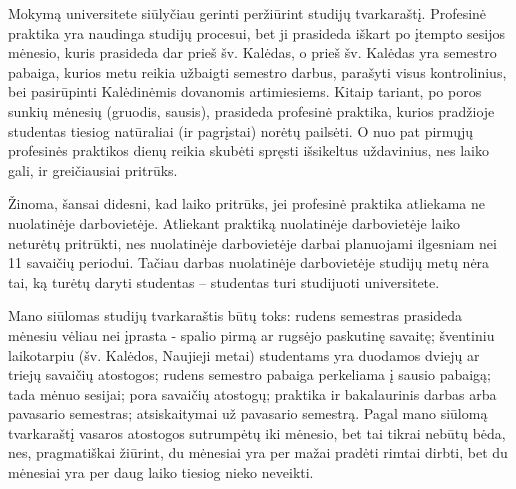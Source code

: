 Mokymą universitete siūlyčiau gerinti peržiūrint studijų tvarkaraštį. Profesinė praktika yra naudinga studijų procesui, bet ji prasideda iškart po įtempto sesijos mėnesio, kuris prasideda dar prieš šv. Kalėdas, o prieš šv. Kalėdas yra semestro pabaiga, kurios metu reikia užbaigti semestro darbus, parašyti visus kontrolinius, bei pasirūpinti Kalėdinėmis dovanomis artimiesiems. Kitaip tariant, po poros sunkių mėnesių (gruodis, sausis), prasideda profesinė praktika, kurios pradžioje studentas tiesiog natūraliai (ir pagrįstai) norėtų pailsėti. O nuo pat pirmųjų profesinės praktikos dienų reikia skubėti spręsti išsikeltus uždavinius, nes laiko gali, ir greičiausiai pritrūks. 

Žinoma, šansai didesni, kad laiko pritrūks, jei profesinė praktika atliekama ne nuolatinėje darbovietėje. Atliekant praktiką nuolatinėje darbovietėje laiko neturėtų pritrūkti, nes nuolatinėje darbovietėje darbai planuojami ilgesniam nei 11 savaičių periodui. Tačiau darbas nuolatinėje darbovietėje studijų metų nėra tai, ką turėtų daryti studentas -- studentas turi studijuoti universitete.

Mano siūlomas studijų tvarkaraštis būtų toks: rudens semestras prasideda mėnesiu vėliau nei įprasta - spalio pirmą ar rugsėjo paskutinę savaitę; šventiniu laikotarpiu (šv. Kalėdos, Naujieji metai) studentams yra duodamos dviejų ar triejų savaičių atostogos; rudens semestro pabaiga perkeliama į sausio pabaigą; tada mėnuo sesijai; pora savaičių atostogų; praktika ir bakalaurinis darbas arba pavasario semestras; atsiskaitymai už pavasario semestrą. Pagal mano siūlomą tvarkaraštį vasaros atostogos sutrumpėtų iki mėnesio, bet tai tikrai nebūtų bėda, nes, pragmatiškai žiūrint, du mėnesiai yra per mažai pradėti rimtai dirbti, bet du mėnesiai yra per daug laiko tiesiog nieko neveikti. 